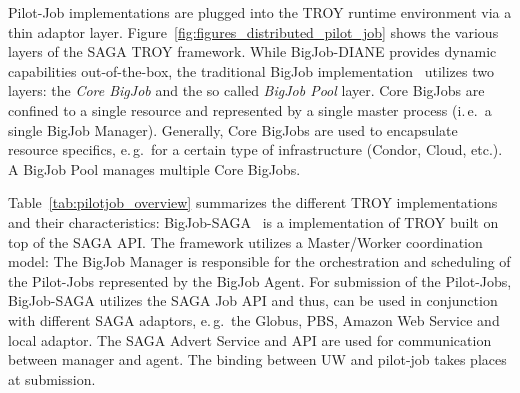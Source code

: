 \documentclass[conference,final]{IEEEtran}
\begin{document}
Pilot-Job implementations are plugged into the TROY runtime environment via a
thin adaptor layer. Figure~\ref{fig:figures_distributed_pilot_job} shows the
various layers of the SAGA TROY framework. While BigJob-DIANE provides dynamic
capabilities out-of-the-box, the traditional BigJob
implementation~\cite{saga_bigjob_condor_cloud} utilizes two layers: the
\emph{Core BigJob} and the so called \emph{BigJob Pool} layer. Core BigJobs are
confined to a single resource and represented by a single master process
(i.\,e.\ a single BigJob Manager). Generally, Core BigJobs are used to
encapsulate resource specifics, e.\,g.\ for a certain type of infrastructure
(Condor, Cloud, etc.). A BigJob Pool manages multiple Core BigJobs.

Table~\ref{tab:pilotjob_overview} summarizes the different TROY implementations
and their characteristics: BigJob-SAGA~\cite{saga_bigjob_condor_cloud} is a
implementation of TROY built on top of the SAGA API. The framework utilizes a
Master/Worker coordination model: The BigJob Manager is responsible for the
orchestration and scheduling of the Pilot-Jobs represented by the BigJob Agent.
For submission of the Pilot-Jobs, BigJob-SAGA utilizes the SAGA Job API and
thus, can be used in conjunction with different SAGA adaptors, e.\,g.\ the
Globus, PBS, Amazon Web Service and local adaptor. The SAGA Advert Service and
API are used for communication between manager and agent. The binding between UW 
and pilot-job takes places at submission.
\end{document}
